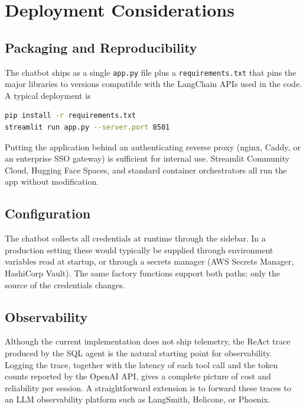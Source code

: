 \documentclass[11pt,a4paper]{article}
\begin{document}
\section{Deployment Considerations}

\subsection{Packaging and Reproducibility}

The chatbot ships as a single \texttt{app.py} file plus a
\texttt{requirements.txt} that pins the major libraries to versions
compatible with the LangChain APIs used in the code. A typical
deployment is
\begin{lstlisting}[language=bash]
pip install -r requirements.txt
streamlit run app.py --server.port 8501
\end{lstlisting}
Putting the application behind an authenticating reverse proxy (nginx,
Caddy, or an enterprise SSO gateway) is sufficient for internal use.
Streamlit Community Cloud, Hugging Face Spaces, and standard
container orchestrators all run the app without modification.

\subsection{Configuration}

The chatbot collects all credentials at runtime through the sidebar.
In a production setting these would typically be supplied through
environment variables read at startup, or through a secrets manager
(AWS Secrets Manager, HashiCorp Vault). The same factory functions
support both paths; only the source of the credentials changes.

\subsection{Observability}

Although the current implementation does not ship telemetry, the
ReAct trace produced by the SQL agent is the natural starting point
for observability. Logging the trace, together with the latency of
each tool call and the token counts reported by the OpenAI API, gives
a complete picture of cost and reliability per session. A
straightforward extension is to forward these traces to an LLM
observability platform such as LangSmith, Helicone, or Phoenix.
\end{document}
